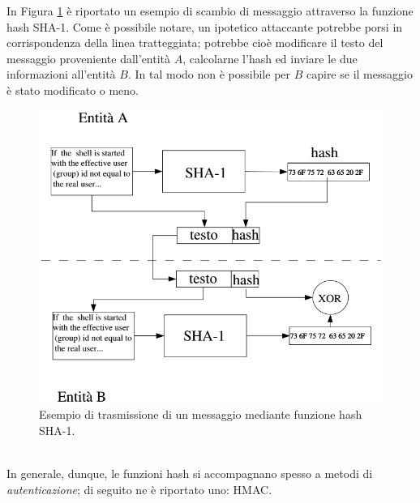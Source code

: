In Figura \ref{img:SHA_example} è riportato un esempio di scambio di messaggio attraverso la funzione hash SHA-1. Come è possibile notare, un ipotetico attaccante potrebbe porsi in corrispondenza della linea tratteggiata; potrebbe cioè modificare il testo del messaggio proveniente dall'entità $A$, calcolarne l'hash ed inviare le due informazioni all'entità $B$. In tal modo non è possibile per $B$ capire se il messaggio è stato modificato o meno.
\begin{figure}[htbp]
	\centering
	\includegraphics[scale = 0.5]{images/SHA_example}
	\caption{Esempio di trasmissione di un messaggio mediante funzione hash SHA-1.}
	\label{img:SHA_example}
\end{figure}\\
In generale, dunque, le funzioni hash si accompagnano spesso a metodi di \textit{autenticazione}; di seguito ne è riportato uno: HMAC. \\

